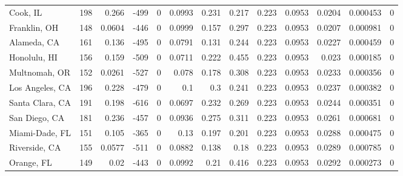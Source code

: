 \documentclass[12pt,letterpaper]{article}
\begin{document}
\begin{sidewaystable}
{\begin{tabular}{lrrrrrrrrrrrr}
 Cook, IL           & 198   & 0.266   & -499   &     0 &         0.0993  &           0.231  &         0.217  &              0.223 &             0.0953 &           0.0204  &        0.000453 &                0 \\
 Franklin, OH       & 148   & 0.0604  & -446   &     0 &         0.0999  &           0.157  &         0.297  &              0.223 &             0.0953 &           0.0207  &        0.000981 &                0 \\
 Alameda, CA        & 161   & 0.136   & -495   &     0 &         0.0791  &           0.131  &         0.244  &              0.223 &             0.0953 &           0.0227  &        0.000459 &                0 \\
 Honolulu, HI       & 156   & 0.159   & -509   &     0 &         0.0711  &           0.222  &         0.455  &              0.223 &             0.0953 &           0.023   &        0.000185 &                0 \\
 Multnomah, OR      & 152   & 0.0261  & -527   &     0 &         0.078   &           0.178  &         0.308  &              0.223 &             0.0953 &           0.0233  &        0.000356 &                0 \\
 Los Angeles, CA    & 196   & 0.228   & -479   &     0 &         0.1     &           0.3    &         0.241  &              0.223 &             0.0953 &           0.0237  &        0.000382 &                0 \\
 Santa Clara, CA    & 191   & 0.198   & -616   &     0 &         0.0697  &           0.232  &         0.269  &              0.223 &             0.0953 &           0.0244  &        0.000351 &                0 \\
 San Diego, CA      & 181   & 0.236   & -457   &     0 &         0.0936  &           0.275  &         0.311  &              0.223 &             0.0953 &           0.0261  &        0.000681 &                0 \\
 Miami-Dade, FL     & 151   & 0.105   & -365   &     0 &         0.13    &           0.197  &         0.201  &              0.223 &             0.0953 &           0.0288  &        0.000475 &                0 \\
 Riverside, CA      & 155   & 0.0577  & -511   &     0 &         0.0882  &           0.138  &         0.18   &              0.223 &             0.0953 &           0.0289  &        0.000785 &                0 \\
 Orange, FL         & 149   & 0.02    & -443   &     0 &         0.0992  &           0.21   &         0.416  &              0.223 &             0.0953 &           0.0292  &        0.000273 &                0 \\

\end{tabular}}
\end{sidewaystable}
\end{document}
